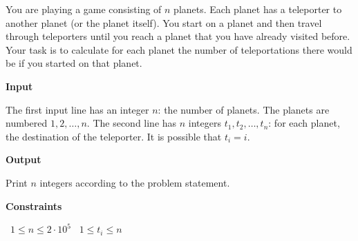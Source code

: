 You are playing a game consisting of $n$ planets. Each planet has a teleporter to another planet (or the planet itself).
You start on a planet and then travel through teleporters until you reach a planet that you have already visited before.
Your task is to calculate for each planet the number of teleportations there would be if you started on that planet.

\vspace{0.3cm}\noindent\textbf{Input}

The first input line has an integer $n$: the number of planets. The planets are numbered $1,2,\dots,n$.
The second line has $n$ integers $t_1,t_2,\dots,t_n$: for each planet, the destination of the teleporter. It is possible that $t_i=i$.

\vspace{0.3cm}\noindent\textbf{Output}

Print $n$ integers according to the problem statement.

\vspace{0.3cm}\noindent\textbf{Constraints}

\textbullet\ $1 \le n \le 2 \cdot 10^5$
\textbullet\ $1 \le t_i \le n$
